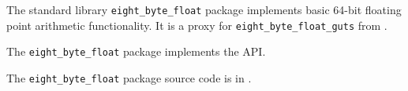 
The standard library {\tt eight\_byte\_float} package implements basic 64-bit floating point arithmetic functionality. 
It is a proxy for {\tt eight\_byte\_float\_guts} from .

The {\tt eight\_byte\_float} package implements the  API.

The {\tt eight\_byte\_float} package source code is in .






